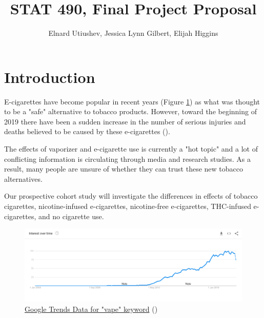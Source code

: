 \documentclass[article]{article}
\title{STAT 490, Final Project Proposal}
\author{Elnard Utiushev, Jessica Lynn Gilbert, Elijah Higgins}
\begin{document}
\maketitle

\tableofcontents



\section{Introduction}

E-cigarettes have become popular in recent years (Figure \ref{fig:vape_trend}) as what was thought to be a "safe" alternative to tobacco products. However, toward the beginning of 2019 there have been a sudden increase in the number of serious injuries and deaths believed to be caused by these e-cigarettes (\cite{doi:10.1056/NEJMoa1911614}).
 
The effects of vaporizer and e-cigarette use is currently a "hot topic" and a lot of conflicting information is circulating through media and research studies. As a result, many people are unsure of whether they can trust these new tobacco alternatives.
 
Our prospective cohort study will investigate the differences in effects of tobacco cigarettes, nicotine-infused e-cigarettes, nicotine-free e-cigarettes, THC-infused e-cigarettes, and no cigarette use.

\begin{figure}[H]
    \centering
    \includegraphics[width=\columnwidth]{google_trends_vape.png}
    \caption{\href{https://trends.google.com/trends/explore?date=all&geo=US&q=vape}{Google Trends Data for "vape" keyword} (\cite{google_trends})}
    \label{fig:vape_trend}
\end{figure}
\end{document}

